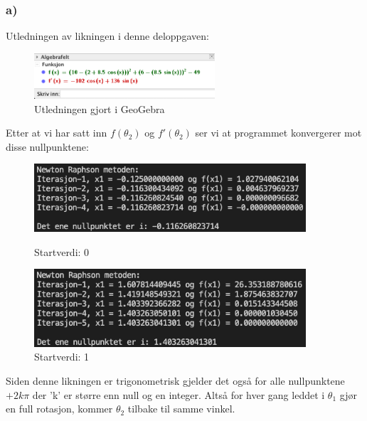\subsubsection{a)}
Utledningen av likningen i denne deloppgaven:

\begin{figure}[h!]
    \centering
    \includegraphics[width = 0.6\textwidth]{Figures/del2_2a_utledning.png}
    \caption{Utledningen gjort i GeoGebra}
    \label{fig:my_label}
\end{figure}

Etter at vi har satt inn $f(\theta_2)$ og $f'(\theta_2)$ ser vi at programmet konvergerer mot disse nullpunktene:

\begin{figure}[h!]
    \centering
    \begin{minipage}{0.45\textwidth}
        \centering
        \includegraphics[width=0.9\textwidth]{Figures/del2_2a_1.png}
        \caption{Startverdi: 0}
    \end{minipage}\hfill
    \begin{minipage}{0.45\textwidth}
        \centering
        \includegraphics[width=0.9\textwidth]{Figures/del2_2a_2.png}
        \caption{Startverdi: 1}
    \end{minipage}
\end{figure}

Siden denne likningen er trigonometrisk gjelder det også for alle nullpunktene $+2k\pi$ der 'k' er større enn null og en integer. Altså for hver gang leddet i $\theta_1$ gjør en full rotasjon, kommer $\theta_2$ tilbake til samme vinkel. %


